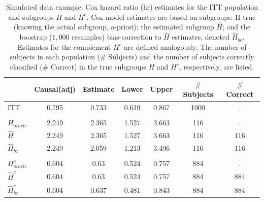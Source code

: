 \documentclass[12pt]{article}
\begin{document}
\begin{table}
\centering
\caption{\label{tab:simex_tab}\label{tab:simex} Simulated data example: Cox hazard ratio (hr) estimates for the ITT population and subgroups $H$ and $H^{c}$.
Cox model estimates are based on subgroups: H true (knowing the actual subgroup, a-priori); the estimated subgroup $\hat{H}$; and 
the boostrap ($1,000$ resamples) bias-correction to $\hat{H}$ estimates, denoted $\hat{H}_{bc}$.  Estimates for the complement $H^{c}$ are defined analogously.
The number of subjects in each population ($\#$ Subjects) and the number of subjects correctly classified ($\#$ Correct) in the true subgroups $H$ and $H^{c}$, respectively, are listed.}
\centering
\fontsize{9}{11}\selectfont
\begin{tabular}[t]{lcccccc}
\toprule
  & Causal(adj) & Estimate & Lower & Upper & $\#$ Subjects & $\#$ Correct\\
\midrule
ITT & 0.795 & 0.733 & 0.619 & 0.867 & 1000 & .\\
\addlinespace[0.3em]
\multicolumn{7}{l}{\textbf{H subgroup estimates}}\\
\hspace{1em}$H_{oracle}$ & 2.249 & 2.365 & 1.527 & 3.663 & 116 & .\\
\hspace{1em}$\hat{H}$ & 2.249 & 2.365 & 1.527 & 3.663 & 116 & 116\\
\hspace{1em}$\hat{H}_{bc}$ & 2.249 & 2.059 & 1.213 & 3.496 & 116 & 116\\
\addlinespace[0.3em]
\multicolumn{7}{l}{\textbf{H-complement subgroup estimates}}\\
\hspace{1em}$H^{c}_{oracle}$ & 0.604 & 0.63 & 0.524 & 0.757 & 884 & .\\
\hspace{1em}$\hat{H}^{c}$ & 0.604 & 0.63 & 0.524 & 0.757 & 884 & 884\\
\hspace{1em}$\hat{H}^{c}_{bc}$ & 0.604 & 0.637 & 0.481 & 0.843 & 884 & 884\\
\bottomrule
\end{tabular}
\end{table}




 

\end{document}
